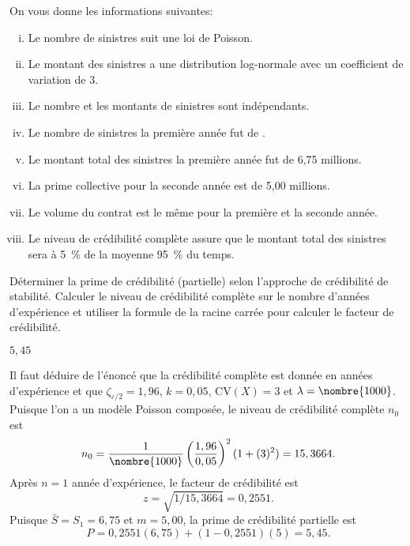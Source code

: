 \begin{exercice}
  On vous donne les informations suivantes:
  \begin{enumerate}[(i)]
  \item Le nombre de sinistres suit une loi de Poisson.
  \item Le montant des sinistres a une distribution log-normale avec un
    coefficient de variation de 3.
  \item Le nombre et les montants de sinistres sont indépendants.
  \item Le nombre de sinistres la première année fut de .
  \item Le montant total des sinistres la première année fut de 6,75
    millions.
  \item La prime collective pour la seconde année est de 5,00
    millions.
  \item Le volume du contrat est le même pour la première et la
    seconde année.
  \item Le niveau de crédibilité complète assure que le montant total
    des sinistres sera à 5~\% de la moyenne 95~\% du temps.
  \end{enumerate}
  Déterminer la prime de crédibilité (partielle) selon l'approche de
  crédibilité de stabilité. Calculer le niveau de crédibilité complète
  sur le nombre d'années d'expérience et utiliser la formule de la
  racine carrée pour calculer le facteur de crédibilité.
  \begin{rep}
    $5,45$
  \end{rep}
  \begin{sol}
    Il faut déduire de l'énoncé que la crédibilité complète est donnée
    en années d'expérience et que $\zeta_{\varepsilon/2} = 1,96$, $k =
    0,05$, $\mathrm{CV}(X) = 3$ et $\lambda = \nombre{1000}$. Puisque
    l'on a un modèle Poisson composée, le niveau de crédibilité
    complète $n_0$ est
    \begin{displaymath}
      n_0 =
      \frac{1}{\nombre{1000}}
      \left( \frac{1,96}{0,05} \right)^2
      (1 + (3)^2) =
      15,3664.
    \end{displaymath}
    Après $n = 1$ année d'expérience, le facteur de crédibilité est
    \begin{equation*}
      z = \sqrt{1/15,3664} = 0,2551.
    \end{equation*}
    Puisque $\bar{S} = S_1 = 6,75$ et $m = 5,00$, la prime de
    crédibilité partielle est
    \begin{displaymath}
      P = 0,2551 (6,75) + (1 - 0,2551) (5) = 5,45.
    \end{displaymath}
  \end{sol}
\end{exercice}

